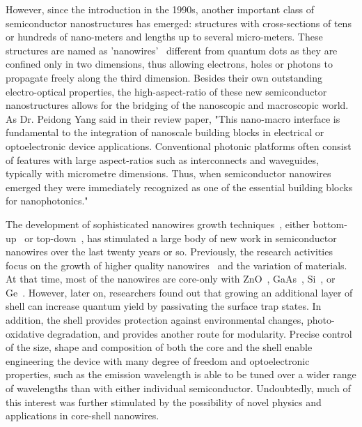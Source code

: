 However, since the introduction in the 1990s, another important class of
semiconductor nanostructures has emerged: structures with cross-sections of
tens or hundreds of nano-meters and lengths up to several micro-meters. These
structures are named as 'nanowires'~\cite{xia2003one} different from quantum
dots as they are confined only in two dimensions, thus allowing electrons,
holes or photons to propagate freely along the third dimension. Besides their
own outstanding electro-optical properties, the high-aspect-ratio of these new
semiconductor nanostructures allows for the bridging of the nanoscopic and
macroscopic world. As Dr. Peidong Yang said in their review paper, "This
nano-macro interface is fundamental to the integration of nanoscale building
blocks in electrical or optoelectronic device applications. Conventional
photonic platforms often consist of features with large aspect-ratios such as
interconnects and waveguides, typically with micrometre dimensions. Thus, when
semiconductor nanowires emerged they were immediately recognized as one of the
essential building blocks for nanophotonics."~\cite{Yan:2009hm}

The development of sophisticated nanowires growth
techniques~\cite{hobbs2012semiconductor,wu2001direct}, either
bottom-up~\cite{lu2007nanoelectronics,Huang:2001kv} or
top-down~\cite{park2009top}, has stimulated a large body of new work in
semiconductor nanowires over the last twenty years or so. Previously, the
research activities focus on the growth of higher quality
nanowires~\cite{Yang:2002ts} and the variation of materials. At that time, most
of the nanowires are core-only with ZnO~\cite{Yang:2002ts},
GaAs~\cite{persson2004solid}, Si~\cite{hochbaum2005controlled}, or
Ge~\cite{wu2000germanium}. However, later on, researchers found out that
growing an additional layer of shell can increase quantum yield by passivating
the surface trap states. In addition, the shell provides protection against
environmental changes, photo-oxidative degradation, and provides another route
for modularity. Precise control of the size, shape and composition of both the
core and the shell enable engineering the device with many degree of freedom
and optoelectronic properties, such as the emission wavelength is able to be
tuned over a wider range of wavelengths than with either individual
semiconductor. Undoubtedly, much of this interest was further stimulated by the
possibility of novel physics and applications in core-shell nanowires.


